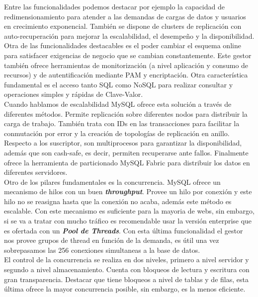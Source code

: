 \documentclass[10pt]{article}
\begin{document}
Entre las funcionalidades podemos destacar por ejemplo la capacidad de redimensionamiento para atender a las demandas de cargas de datos y usuarios en crecimiento exponencial. También se dispone de clusters de replicación con auto-recuperación para mejorar la escalabilidad, el desempeño y la disponibilidad.\\
Otra de las funcionalidades destacables es el poder cambiar el esquema online para satisfacer exigencias de negocio que se cambian constantemente. Este gestor también ofrece herramientas de monitorización (a nivel aplicación y consumo de recursos) y de autentificación mediante PAM y encriptación.
Otra característica fundamental es el acceso tanto SQL como NoSQL para realizar consultar y operaciones simples y rápidas de Clave-Valor.\\

Cuando hablamos de escalabilidad MySQL ofrece esta solución a través de diferentes métodos. Permite replicación sobre diferentes nodos para distribuir la carga de trabajo. También trata con IDs en las transacciones para facilitar la conmutación por error y la creación de topologías de replicación en anillo. Respecto a los suscriptor, son multiprocesos para garantizar la disponibilidad, además que son cash-safe, es decir, permiten recuperarse ante fallos. Finalmente ofrece la herramienta de particionado MySQL Fabric para distribuir los datos en diferentes servidores.\cite{lock}\\

Otro de los pilares fundamentales es la concurrencia. MySQL ofrece un mecanismo de hilos con un buen \textbf{\emph{throughput}}. Provee un hilo por conexión y este hilo no se reasigna hasta que la conexión no acaba, además este método es escalable. Con este mecanismo es suficiente para la mayoria de webs, sin embargo, si se va a tratar con mucho tráfico es recomendable usar la versión enterprise que es ofertada con un \textbf{\emph{Pool de Threads}}. Con esta última funcionalidad el gestor nos provee grupos de thread en función de la demanda, es útil una vez sobrepasamos las 256 conexiones simultaneas a la base de datos.\\
El control de la concurrencia se realiza en dos niveles, primero a nivel servidor y segundo a nivel almacenamiento. Cuenta con bloqueos de lectura y escritura con gran transparencia. Destacar que tiene bloqueos a nivel de tablas y de filas, esta última ofrece la mayor concurrencia posible, sin embargo, es la menos eficiente. \cite{enterprise}\\
\end{document}
